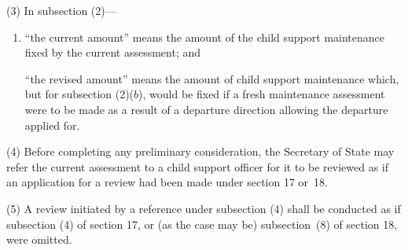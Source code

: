 \documentclass[12pt,a4paper]{article}
\begin{document}
(3) In subsection (2)—
\begin{enumerate}\item[]
    “the current amount” means the amount of the child support maintenance fixed by the current assessment; and

    “the revised amount” means the amount of child support maintenance which, but for subsection (2)($b$), would be fixed if a fresh maintenance assessment were to be made as a result of a departure direction allowing the departure applied for. 
\end{enumerate}

(4) Before completing any preliminary consideration, the Secretary of State may refer the current assessment to a child support officer for it to be reviewed as if an application for a review had been made under section 17 or~18.

(5) A review initiated by a reference under subsection (4) shall be conducted as if subsection (4) of section 17, or (as the case may be) subsection~(8) of section 18, were omitted.
%
%

%
\end{document}
